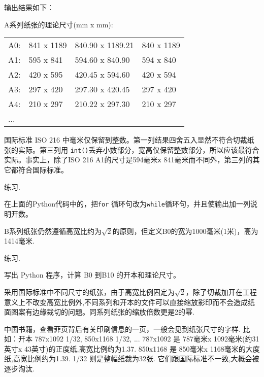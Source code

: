 输出结果如下：
\vspace{.4cm}
\begin{spacing}{0.8}
A系列纸张的理论尺寸(mm \textsf{x} mm):

\begin{tabular}{l l l l}
 A0: & 841 \textsf{x} 1189  &  840.90  \textsf{x} 1189.21   &  840  \textsf{x} 1189 \\
 A1: & 595 \textsf{x} 841 &    594.60  \textsf{x} 840.90   &   594  \textsf{x} 840\\
 A2: & 420 \textsf{x} 595   &  420.45  \textsf{x} 594.60  &    420  \textsf{x} 594\\
 A3: & 297 \textsf{x} 420   &  297.30  \textsf{x} 420.45   &   297  \textsf{x} 420\\
 A4: & 210 \textsf{x} 297   &  210.22  \textsf{x} 297.30    &  210  \textsf{x} 297\\
 ...
\end{tabular}


\end{spacing}
\vspace{.4cm}\label{a_paper_py}
国际标准 ISO 216 中毫米仅保留到整数。第一列结果四舍五入显然不符合切裁纸张的实际。第三列用 \texttt{int()}丢弃小数部分，宽高仅保留整数部分，所以应该最符合实际。事实上，除了ISO 216 A1的尺寸是594毫米\texttt{x}{ }841毫米而不同外，第三列的其它都符合国际标准。

\begin{kaishu}练习.\end{kaishu} 在上面的Python代码中的，把\texttt{for} 循环句改为\texttt{while}循环句，并且使输出加一列说明开数。

B系列纸张仍然遵循高宽比约为$\sqrt{2}$的原则，但定义B0的宽为1000毫米(1米)，高为1414毫米.

\begin{kaishu}练习.\end{kaishu} 写出 Python 程序，计算 B0 到B10 的开本和理论尺寸。 

采用国际标准中不同尺寸的纸张，由于高宽比例固定为$\sqrt{2}$，除了切裁加开在工程意义上不改变高宽比例外,不同系列和开本的文件可以直接缩放影印而不会造成纸面图案有边缘裁切的问题。同系列纸张的缩放倍数更是2的幂.

中国书籍，查看菲页背后有关印刷信息的一页，一般会见到纸张尺寸的字样.
比如：开本 787x1092 1/32, 850x1168 1/32, ... 
787x1092 是 787毫米x{ }1092毫米(约31英寸x{ }43英寸)的正度纸,高宽比例约为1.37.
850x1168 是 850毫米x{ }1168毫米的大度纸,高宽比例约为1.39.
1/32 则是整幅纸裁为32张.
它们跟国际标准不一致,大概会被逐步淘汰.


